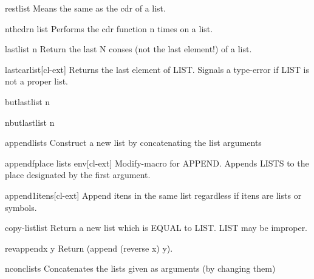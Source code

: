 \documentclass[10pt,english]{book}
\begin{document}
\begin{accessor}{rest}{list}
  Means the same as the cdr of a list.
\end{accessor}

\begin{function}{nthcdr}{n list}
  Performs the cdr function n times on a list.
\end{function}

\begin{function}{last}{list \op n}
  Return the last N conses (not the last element!) of a list.
\end{function}

\begin{function}{lastcar}{list}[cl-ext]
  Returns the last element of LIST. Signals a type-error if LIST is not a
proper list.
\end{function}

\begin{function}{butlast}{list \op n}
  
\end{function}

\begin{function}{nbutlast}{list \op n}
  
\end{function}

\begin{function}{append}{\rest lists}
  Construct a new list by concatenating the list arguments
\end{function}

\begin{macro}{appendf}{place \rest lists \env env}[cl-ext]
  Modify-macro for APPEND. Appends LISTS to the place designated by the first
argument.
\end{macro}

\begin{function}{append1}{\rest itens}[cl-ext]
  Append itens in the same list regardless if itens are lists or
  symbols.
\end{function}

\begin{function}{copy-list}{list}
  Return a new list which is EQUAL to LIST. LIST may be improper.
\end{function}

\begin{function}{revappend}{x y}
  Return (append (reverse x) y).
\end{function}

\begin{function}{nconc}{\rest lists}
  Concatenates the lists given as arguments (by changing them)
\end{function}
\end{document}
